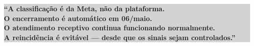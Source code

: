 \documentclass[12pt, a4paper]{article}
\begin{document}
\vspace{0.5cm}

\begin{center}
\colorbox{lightGray}{%
    \parbox{0.85\textwidth}{%
        \centering
        \vspace{0.3cm}
        \textcolor{primaryColor}{\textbf{``A classificação é da Meta, não da plataforma.}}\\
        \textcolor{primaryColor}{\textbf{O encerramento é automático em 06/maio.}}\\
        \textcolor{primaryColor}{\textbf{O atendimento receptivo continua funcionando normalmente.}}\\
        \textcolor{primaryColor}{\textbf{A reincidência é evitável --- desde que os sinais sejam controlados.''}}\\
        \vspace{0.3cm}
    }%
}
\end{center}

\pagebreak

\thispagestyle{empty}
\vspace*{0.5cm}
\end{document}
